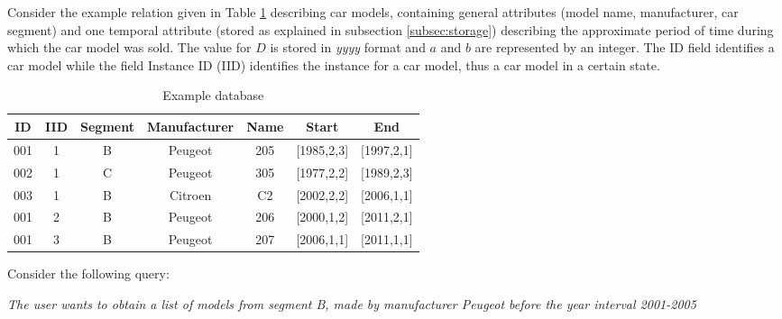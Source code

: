 \begin{example} 

Consider the example relation given in Table \ref{tb:car-models} describing car models, containing general attributes (model name, manufacturer, car segment) and one temporal attribute (stored as explained in subsection \ref{subsec:storage}) describing the approximate period of time during which the car model was sold. The value for $D$ is stored in \emph{yyyy} format and $a$ and $b$ are represented by an integer. The ID field identifies a car model while the field Instance ID (IID) identifies the instance for a car model, thus a car model in a certain state.

\end{example}
\begin{table}[h]
\centering
\caption{Example database}
\begin{tabular}{c c c c c c c}
\hline
ID & IID & Segment & Manufacturer & Name & Start & End  \\ [0.5ex]
\hline
001 & 1 & B & Peugeot & 205 & [1985,2,3] & [1997,2,1] \\
002 & 1 & C & Peugeot & 305 & [1977,2,2] & [1989,2,3] \\
003 & 1 & B & Citroen & C2 & [2002,2,2] & [2006,1,1] \\
001 & 2 & B & Peugeot & 206 & [2000,1,2] & [2011,2,1] \\
001 & 3 & B & Peugeot & 207 & [2006,1,1] & [2011,1,1]\\
\hline
\end{tabular}
\vspace{10pt}
\label{tb:car-models}
\vspace{-30pt}
\end{table}

Consider the following query:\\
\begin{center}
\emph{The user wants to obtain a list of models from segment B, made by manufacturer Peugeot before the year interval 2001-2005}\\
\end{center}

